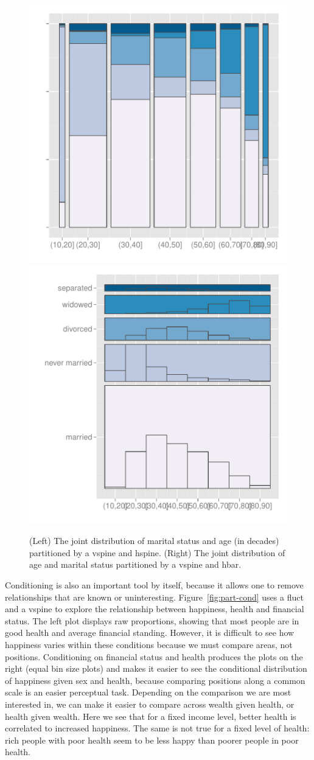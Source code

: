 \documentclass[journal]{vgtc}
\begin{document}
\begin{figure}[htbp]
  \centering
    \includegraphics[width=0.5\linewidth]{part-marital-1}%
    \includegraphics[width=0.5\linewidth]{part-marital-2}
  \caption{(Left) The joint distribution of marital status and age (in decades) partitioned by a vspine and hspine.  (Right) The joint distribution of age and marital status partitioned by a vspine and hbar.}
  \label{fig:marital}
\end{figure}

Conditioning is also an important tool by itself, because it allows one to remove relationships that are known or uninteresting. Figure~\ref{fig:part-cond} uses a fluct and a vspine to explore the relationship between happiness, health and financial status. The left plot displays raw proportions, showing that most people are in good health and average financial standing. However, it is difficult to see how happiness varies within these conditions because we must compare areas, not positions. Conditioning on financial status and health produces the plots on the right (equal bin size plots) and makes it easier to see the conditional distribution of happiness given sex and health, because comparing positions along a common scale is an easier perceptual task. Depending on the comparison we are most interested in, we can make it easier to compare across wealth given health, or health given wealth. Here we see that for a fixed income level, better health is correlated to increased happiness. The same is not true for a fixed level of health: rich people with poor health seem to be less happy than poorer people in poor health.
\end{document}
